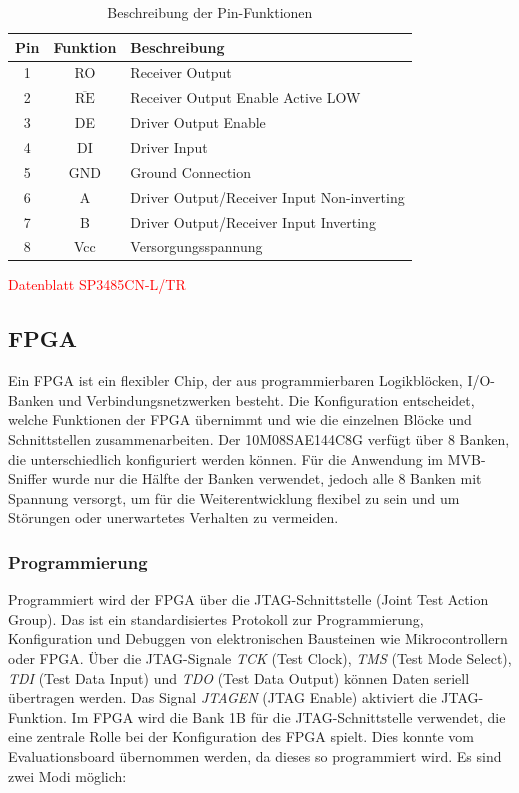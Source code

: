\begin{table}[h]
  \centering
  \begin{tabular}{|c|c|l|}
    \hline
    \textbf{Pin} & \textbf{Funktion} & \textbf{Beschreibung} \\ \hline
    1 & RO & Receiver Output \\ \hline
    2 & $\overline{\text{RE}}$ & Receiver Output Enable Active LOW \\ \hline
    3 & DE & Driver Output Enable \\ \hline
    4 & DI & Driver Input \\ \hline
    5 & GND & Ground Connection \\ \hline
    6 & A & Driver Output/Receiver Input Non-inverting \\ \hline
    7 & B & Driver Output/Receiver Input Inverting\\ \hline
    8 & Vcc & Versorgungsspannung \\ \hline
  \end{tabular}
  \caption{Beschreibung der Pin-Funktionen}
  \label{tab:pin_funktionen}
\end{table}

\textcolor{red}{Datenblatt SP3485CN-L/TR} 

\subsection{FPGA}
Ein FPGA ist ein flexibler Chip, der aus programmierbaren Logikblöcken, I/O-Banken und Verbindungsnetzwerken besteht. Die Konfiguration entscheidet, welche Funktionen der FPGA übernimmt und wie die einzelnen Blöcke und Schnittstellen zusammenarbeiten. Der 10M08SAE144C8G verfügt über 8 Banken, die unterschiedlich konfiguriert werden können. Für die Anwendung im MVB-Sniffer wurde nur die Hälfte der Banken verwendet, jedoch alle 8 Banken mit Spannung versorgt, um für die Weiterentwicklung flexibel zu sein und um Störungen oder unerwartetes Verhalten zu vermeiden. 

\subsubsection{Programmierung}

Programmiert wird der FPGA über die JTAG-Schnittstelle (Joint Test Action Group). Das ist ein standardisiertes Protokoll zur Programmierung, Konfiguration und Debuggen von elektronischen Bausteinen wie Mikrocontrollern oder FPGA. Über die JTAG-Signale \textit{TCK} (Test Clock), \textit{TMS} (Test Mode Select), \textit{TDI} (Test Data Input) und \textit{TDO} (Test Data Output) können Daten seriell übertragen werden. Das Signal \textit{JTAGEN} (JTAG Enable) aktiviert die JTAG-Funktion. Im FPGA wird die Bank 1B für die JTAG-Schnittstelle verwendet, die eine zentrale Rolle bei der Konfiguration des FPGA spielt. Dies konnte vom Evaluationsboard übernommen werden, da dieses so programmiert wird. Es sind zwei Modi möglich:

